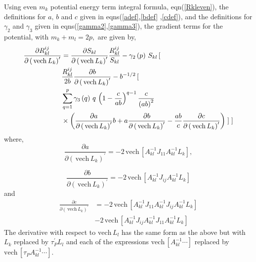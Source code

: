 \documentclass[12pt]{article}
\begin{document}
Using even $m_{k}$ potential energy term integral formula, eqn(\ref{Rkleven}),
the definitions for $a,\,b$ and $c$ given in eqns(\ref{adef},\ref{bdef}%
,\ref{cdef}), and the definitions for $\gamma_{2}$ and $\gamma_{3}$ given in
eqns(\ref{gamma2},\ref{gamma3}), the gradient terms for the potential, with
$m_{k}+m_{l}=2p,$ are given by,
\begin{align}
\frac{\partial R_{kl}^{ij}}{\partial\left(  \,\mathrm{vech}\,L_{k}\right)
^{\prime}}  & =\frac{\partial S_{kl}}{\partial\left(  \,\mathrm{vech}%
\,L_{k}\right)  ^{\prime}}\frac{R_{kl}^{ij}}{S_{kl}}-\gamma_{2}\left(
p\right)  \,S_{kl}\left[
\begin{array}
[c]{c}
\end{array}
\right.  \nonumber\\
& \frac{R_{kl}^{ij}}{2b}\frac{\partial b}{\partial\left(  \,\mathrm{vech}%
\,L_{k}\right)  ^{\prime}}-b^{-1/2}\left[
\begin{array}
[c]{c}
\end{array}
\right.  \nonumber\\
& \sum_{q=1}^{p}\gamma_{3}\left(  q\right)  \,q\,\left(  1-\frac{c}%
{ab}\right)  ^{q-1}\frac{c}{\left(  ab\right)  ^{2}}\nonumber\\
& \times\left(  \frac{\partial a}{\partial\left(  \,\mathrm{vech}%
\,L_{k}\right)  ^{\prime}}b+a\frac{\partial b}{\partial\left(  \,\mathrm{vech}%
\,L_{k}\right)  ^{\prime}}-\frac{ab}{c}\frac{\partial c}{\partial\left(
\,\mathrm{vech}\,L_{k}\right)  ^{\prime}}\right)  \left.
\begin{array}
[c]{c}
\end{array}
\right]  \left.
\begin{array}
[c]{c}
\end{array}
\right]
\end{align}
where,
\begin{equation}
\frac{\partial a}{\partial\left(  \,\mathrm{vech}\,L_{k}\right)  ^{\prime}%
}=-2\,\mathrm{vech}\,\left[  A_{kl}^{-1}J_{11}A_{kl}^{-1}L_{k}\right]  ,
\end{equation}%

\begin{equation}
\frac{\partial b}{\partial\left(  \,\mathrm{vech}\,L_{k}\right)  ^{\prime}%
}=-2\,\mathrm{vech}\,\left[  A_{kl}^{-1}J_{ij}A_{kl}^{-1}L_{k}\right]
\end{equation}
and
\begin{align}
\frac{\partial c}{\partial\left(  \,\mathrm{vech}\,L_{k}\right)  ^{\prime}}  &
=-2\,\mathrm{vech}\,\left[  A_{kl}^{-1}J_{11}A_{kl}^{-1}J_{ij}A_{kl}^{-1}%
L_{k}\right] \nonumber\\
& -2\,\mathrm{vech}\,\left[  A_{kl}^{-1}J_{ij}A_{kl}^{-1}J_{11}A_{kl}%
^{-1}L_{k}\right]
\end{align}
The derivative with respect to $\mathrm{vech}\,L_{l}$ has the same form as the
above but with $L_{k}$ replaced by $\tau_{P}^{\prime}L_{l}$ and each of the
expressions $\mathrm{vech}\,\left[  A_{kl}^{-1}\cdots\right]  $ replaced by
$\mathrm{vech}\,\left[  \tau_{P}A_{kl}^{-1}\cdots\right]  .$
\end{document}
